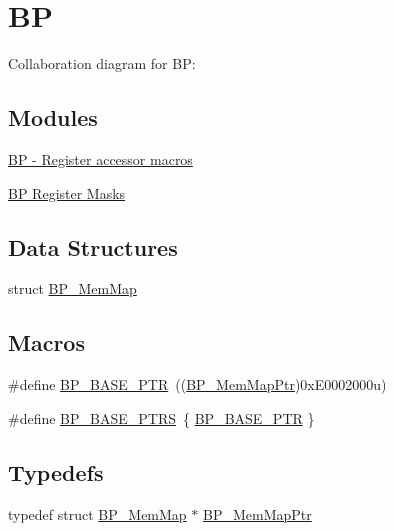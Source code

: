 \hypertarget{group___b_p___peripheral}{}\section{BP}
\label{group___b_p___peripheral}
Collaboration diagram for BP\+:
\subsection*{Modules}
\begin{DoxyCompactItemize}
\item 
\hyperlink{group___b_p___register___accessor___macros}{B\+P -\/ Register accessor macros}
\item 
\hyperlink{group___b_p___register___masks}{B\+P Register Masks}
\end{DoxyCompactItemize}
\subsection*{Data Structures}
\begin{DoxyCompactItemize}
\item 
struct \hyperlink{struct_b_p___mem_map}{B\+P\+\_\+\+Mem\+Map}
\end{DoxyCompactItemize}
\subsection*{Macros}
\begin{DoxyCompactItemize}
\item 
\#define \hyperlink{group___b_p___peripheral_ga375cd6d2e7ec414f4e33cb54d5494940}{B\+P\+\_\+\+B\+A\+S\+E\+\_\+\+P\+TR}~((\hyperlink{group___b_p___peripheral_gaa250950ffe336f8c6e5895e3a1e4ca86}{B\+P\+\_\+\+Mem\+Map\+Ptr})0x\+E0002000u)
\item 
\#define \hyperlink{group___b_p___peripheral_ga6c07114ad41ccb42b134e8834f123598}{B\+P\+\_\+\+B\+A\+S\+E\+\_\+\+P\+T\+RS}~\{ \hyperlink{group___b_p___peripheral_ga375cd6d2e7ec414f4e33cb54d5494940}{B\+P\+\_\+\+B\+A\+S\+E\+\_\+\+P\+TR} \}
\end{DoxyCompactItemize}
\subsection*{Typedefs}
\begin{DoxyCompactItemize}
\item 
typedef struct \hyperlink{struct_b_p___mem_map}{B\+P\+\_\+\+Mem\+Map} $\ast$ \hyperlink{group___b_p___peripheral_gaa250950ffe336f8c6e5895e3a1e4ca86}{B\+P\+\_\+\+Mem\+Map\+Ptr}
\end{DoxyCompactItemize}


